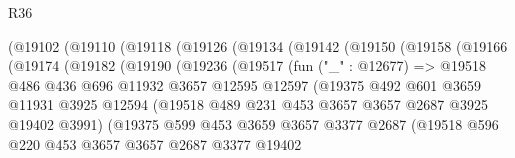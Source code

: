 \begin{lexlean}{R36}
\begin{coremodule}
            (@19102
              (@19110
                (@19118
                  (@19126
                    (@19134
                      (@19142
                        (@19150
                          (@19158
                            (@19166
                              (@19174
                                (@19182
                                  (@19190
                                    (@19236
                                      (@19517
                                        (fun ("_" : @12677) =>
                                        @19518
                                          @486
                                          @436
                                          @696
                                          @11932
                                          @3657
                                          @12595
                                          @12597
                                          (@19375
                                            @492
                                            @601
                                            @3659
                                            @11931
                                            @3925
                                            @12594
                                            (@19518
                                              @489
                                              @231
                                              @453
                                              @3657
                                              @3657
                                              @2687
                                              @3925
                                              @19402
                                              @3991)
                                            (@19375
                                              @599
                                              @453
                                              @3659
                                              @3657
                                              @3377
                                              @2687
                                              (@19518
                                                @596
                                                @220
                                                @453
                                                @3657
                                                @3657
                                                @2687
                                                @3377
                                                @19402

\end{coremodule}
\end{lexlean}

